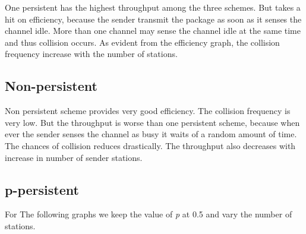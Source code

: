 \documentclass[14pt,titlepage, a4paper]{extarticle}
\begin{document}
One persistent has the highest throughput among the three schemes.
But takes a hit on efficiency, because the sender transmit the package as soon as
it senses the channel idle. More than one channel may sense the channel idle
at the same time and thus collision occurs. As evident from the efficiency
graph, the collision frequency increase with the number of stations.

\subsection{Non-persistent}
\null
{}

Non persistent scheme provides very good efficiency. The collision frequency
is very low. But the throughput is worse than one persistent scheme, because
when ever the sender senses the channel as busy it waits of a random amount of time.
The chances of collision reduces drastically. The throughput also decreases with
increase in number of sender stations.

\subsection{p-persistent}
For The following graphs we keep the value of \emph{p} at 0.5 and
vary the number of stations.
\\
\nopagebreak
\noindent
{}
\null
{}
\end{document}
